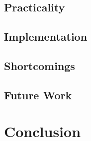 \documentclass{report}
\begin{document}
\subsection{Practicality}

\subsection{Implementation}

\subsection{Shortcomings}

\subsection{Future Work}

\section{Conclusion}




\end{document}
